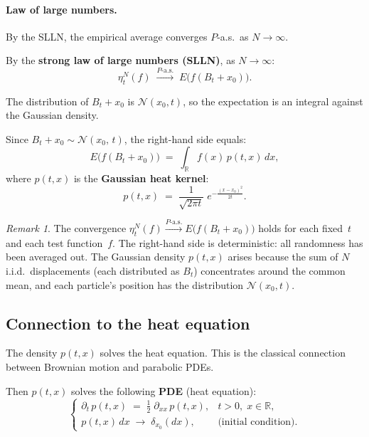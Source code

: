 \documentclass[11pt]{article}
\theoremstyle{definition}
\theoremstyle{remark}
\newtheorem{remark}{Remark}
\begin{document}
\paragraph{Law of large numbers.}
By the SLLN, the empirical average converges $P$-a.s.\ as $N \to \infty$.

By the \textbf{strong law of large numbers (SLLN)},
as $N \to \infty$:
\[
    \eta_t^N(f)
    \;\xrightarrow{P\text{-a.s.}}\;
    E\!\bigl(f(B_t + x_0)\bigr).
\]

The distribution of $B_t + x_0$ is $\mathcal{N}(x_0, t)$, so the expectation is an integral against the Gaussian density.

Since $B_t + x_0 \sim \mathcal{N}(x_0,\, t)$,
the right-hand side equals:
\[
    E\!\bigl(f(B_t + x_0)\bigr)
    \;=\;
    \int_{\mathbb{R}} f(x)\,p(t, x)\,dx,
\]
where $p(t, x)$ is the \textbf{Gaussian heat kernel}:
\[
    p(t, x)
    \;=\;
    \frac{1}{\sqrt{2\pi t}}\;
    e^{-\frac{(x - x_0)^2}{2t}}.
\]

\begin{remark}
The convergence $\eta_t^N(f) \xrightarrow{P\text{-a.s.}} E\!\bigl(f(B_t + x_0)\bigr)$ holds for each fixed~$t$ and each test function~$f$.  The right-hand side is deterministic: all randomness has been averaged out.  The Gaussian density $p(t,x)$ arises because the sum of $N$ i.i.d.\ displacements (each distributed as $B_t$) concentrates around the common mean, and each particle's position has the distribution $\mathcal{N}(x_0, t)$.
\end{remark}

\subsection*{Connection to the heat equation}

The density $p(t,x)$ solves the heat equation. This is the classical connection between Brownian motion and parabolic PDEs.

Then $p(t, x)$ solves the following \textbf{PDE} (heat equation):
\[
    \boxed{
    \begin{cases}
        \displaystyle
        \partial_t\, p(t, x)
        \;=\;
        \tfrac{1}{2}\;\partial_{xx}\, p(t, x),
        & t > 0,\; x \in \mathbb{R}, \\[10pt]
        p(t, x)\,dx
        \;\longrightarrow\;
        \delta_{x_0}(dx),
        & \text{(initial condition)}.
    \end{cases}
    }
\]
\end{document}
